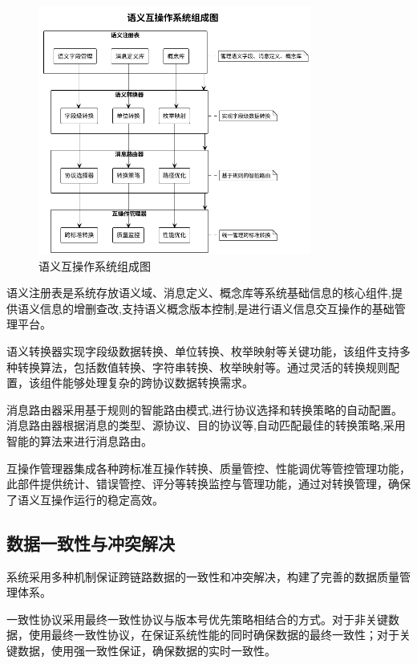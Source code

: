 \begin{figure}[H]
    \centering
    \includegraphics[width=0.8\textwidth]{chapters/fig-0/semantic_interop_system_simple.png}
    \caption{语义互操作系统组成图}
    \label{fig:semantic_interop_system}
\end{figure}

语义注册表是系统存放语义域、消息定义、概念库等系统基础信息的核心组件,提供语义信息的增删查改,支持语义概念版本控制,是进行语义信息交互操作的基础管理平台。

语义转换器实现字段级数据转换、单位转换、枚举映射等关键功能，该组件支持多种转换算法，包括数值转换、字符串转换、枚举映射等。通过灵活的转换规则配置，该组件能够处理复杂的跨协议数据转换需求。

消息路由器采用基于规则的智能路由模式,进行协议选择和转换策略的自动配置。消息路由器根据消息的类型、源协议、目的协议等,自动匹配最佳的转换策略,采用智能的算法来进行消息路由。

互操作管理器集成各种跨标准互操作转换、质量管控、性能调优等管控管理功能，此部件提供统计、错误管控、评分等转换监控与管理功能，通过对转换管理，确保了语义互操作运行的稳定高效。

\subsection{数据一致性与冲突解决}

系统采用多种机制保证跨链路数据的一致性和冲突解决，构建了完善的数据质量管理体系。

一致性协议采用最终一致性协议与版本号优先策略相结合的方式。对于非关键数据，使用最终一致性协议，在保证系统性能的同时确保数据的最终一致性；对于关键数据，使用强一致性保证，确保数据的实时一致性。

